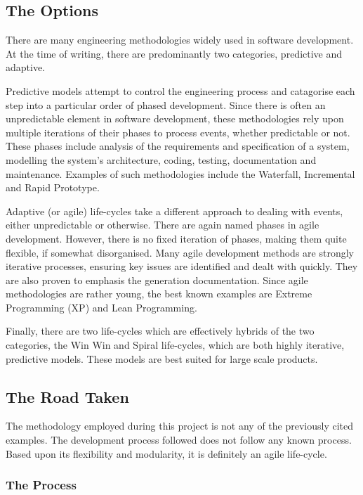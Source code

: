 
\subsection{The Options}

There are many engineering methodologies widely used in software
development. At the time of writing, there are predominantly two
categories, predictive and adaptive.


Predictive models attempt to control the engineering process and
catagorise each step into a particular order of phased development. 
Since there is often an unpredictable element in software development, 
these methodologies rely upon multiple iterations of their phases to 
process events, whether predictable or not. These phases include 
analysis of the requirements and specification of a system, modelling 
the system's architecture, coding, testing, documentation and 
maintenance. Examples of such methodologies include the Waterfall, 
Incremental and Rapid Prototype.


Adaptive (or agile) life-cycles take a different approach to dealing 
with events, either unpredictable or otherwise. There are again named 
phases in agile development. However, there is no fixed iteration of 
phases, making them quite flexible, if somewhat disorganised. Many 
agile development methods are strongly iterative processes, ensuring key 
issues are identified and dealt with quickly. They are also proven to
emphasis the generation documentation. Since agile methodologies are 
rather young, the best known examples are Extreme Programming (XP) and 
Lean Programming.


Finally, there are two life-cycles which are effectively hybrids of the
two categories, the Win Win and Spiral life-cycles, which are both highly
iterative, predictive models. These models are best suited for large
scale products.

\subsection{The Road Taken}

The methodology employed during this project is not any of the
previously cited examples. The development process followed does not 
follow any known process. Based upon its flexibility and modularity, 
it is definitely an agile life-cycle.

\subsubsection{The Process}

